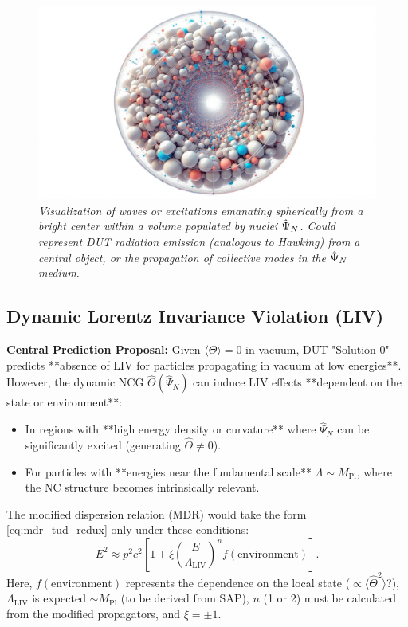 \documentclass[11pt, a4paper]{article}
\theoremstyle{remark}
\newcommand{\Op}[1]{\hat{#1}}
\newcommand{\Mpl}{M_{\mathrm{Pl}}}
\begin{document}
\begin{figure}[htbp]
    \centering
    \includegraphics[width=0.6\linewidth]{OIG10.ZNLJ.PNG}
    \caption{%
      \footnotesize\textit{Visualization of waves or excitations emanating spherically from a bright center within a volume populated by nuclei \(\protect\Op{\Psi}_N\). Could represent DUT radiation emission (analogous to Hawking) from a central object, or the propagation of collective modes in the \(\protect\Op{\Psi}_N\) medium.}
    }
    \label{fig:Figura13}
\end{figure}

\subsection{Dynamic Lorentz Invariance Violation (LIV)}
\label{subsec:liv_specific_final_revised}

\textbf{Central Prediction Proposal:}
Given \( \langle \Op{\Theta} \rangle = 0 \) in vacuum, DUT "Solution 0" predicts **absence of LIV for particles propagating in vacuum at low energies**. However, the dynamic NCG \( \Op{\Theta}(\Op{\Psi}_N) \) can induce LIV effects **dependent on the state or environment**:
\begin{itemize}
    \item In regions with **high energy density or curvature** where \( \Op{\Psi}_N \) can be significantly excited (generating \( \Op{\Theta} \neq 0 \)).
    \item For particles with **energies near the fundamental scale** \( \Lambda \sim \Mpl \), where the NC structure becomes intrinsically relevant.
\end{itemize}
The modified dispersion relation (MDR) would take the form \eqref{eq:mdr_tud_redux} only under these conditions:
\begin{equation} \label{eq:mdr_tud_redux}
E^2 \approx p^2c^2 \left[ 1 + \xi \left(\frac{E}{\Lambda_{\text{LIV}}}\right)^n f(\text{environment}) \right].
\end{equation}
Here, \( f(\text{environment}) \) represents the dependence on the local state (\( \propto \langle \Op{\Theta}^2 \rangle \)?), \( \Lambda_{\text{LIV}} \) is expected \( \sim \Mpl \) (to be derived from SAP), \( n \) (1 or 2) must be calculated from the modified propagators, and \( \xi = \pm 1 \).
\end{document}

